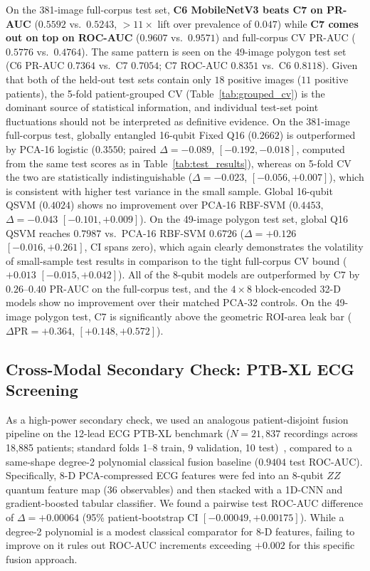 \documentclass[conference]{IEEEtran}
\begin{document}
On the 381-image full-corpus test set, \textbf{C6 MobileNetV3 beats C7 on PR-AUC} ($0.5592$ vs.\ $0.5243$, $>11\times$ lift over prevalence of $0.047$) while \textbf{C7 comes out on top on ROC-AUC} ($0.9607$ vs.\ $0.9571$) and full-corpus CV PR-AUC ($0.5776$ vs.\ $0.4764$). The same pattern is seen on the 49-image polygon test set (C6 PR-AUC $0.7364$ vs.\ C7 $0.7054$; C7 ROC-AUC $0.8351$ vs.\ C6 $0.8118$). Given that both of the held-out test sets contain only $18$ positive images ($11$ positive patients), the 5-fold patient-grouped CV (Table~\ref{tab:grouped_cv}) is the dominant source of statistical information, and individual test-set point fluctuations should not be interpreted as definitive evidence. On the 381-image full-corpus test, globally entangled 16-qubit Fixed Q16 ($0.2662$) is outperformed by PCA-16 logistic ($0.3550$; paired $\Delta = -0.089$, $[-0.192, -0.018]$, computed from the same test scores as in Table~\ref{tab:test_results}), whereas on 5-fold CV the two are statistically indistinguishable ($\Delta = -0.023$, $[-0.056, +0.007]$), which is consistent with higher test variance in the small sample. Global 16-qubit QSVM ($0.4024$) shows no improvement over PCA-16 RBF-SVM ($0.4453$, $\Delta = -0.043$ $[-0.101, +0.009]$). On the 49-image polygon test set, global Q16 QSVM reaches $0.7987$ vs.\ PCA-16 RBF-SVM $0.6726$ ($\Delta = +0.126$ $[-0.016, +0.261]$, CI spans zero), which again clearly demonstrates the volatility of small-sample test results in comparison to the tight full-corpus CV bound ($+0.013$ $[-0.015, +0.042]$). All of the 8-qubit models are outperformed by C7 by $0.26$--$0.40$ PR-AUC on the full-corpus test, and the $4\times 8$ block-encoded 32-D models show no improvement over their matched PCA-32 controls. On the 49-image polygon test, C7 is significantly above the geometric ROI-area leak bar ($\Delta\text{PR} = +0.364$, $[+0.148, +0.572]$).

\subsection{Cross-Modal Secondary Check: PTB-XL ECG Screening}
As a high-power secondary check, we used an analogous patient-disjoint fusion pipeline on the 12-lead ECG PTB-XL benchmark ($N = 21,837$ recordings across 18,885 patients; standard folds 1--8 train, 9 validation, 10 test)~\cite{wagner2020ptb}, compared to a same-shape degree-2 polynomial classical fusion baseline ($0.9404$ test ROC-AUC). Specifically, 8-D PCA-compressed ECG features were fed into an 8-qubit $ZZ$ quantum feature map (36 observables) and then stacked with a 1D-CNN and gradient-boosted tabular classifier. We found a pairwise test ROC-AUC difference of $\Delta = +0.00064$ (95\% patient-bootstrap CI $[-0.00049, +0.00175]$). While a degree-2 polynomial is a modest classical comparator for 8-D features, failing to improve on it rules out ROC-AUC increments exceeding $+0.002$ for this specific fusion approach.
\end{document}
